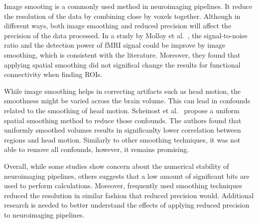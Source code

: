 Image smooting is a commonly used method in neuroimaging pipelines.
It reduce the resolution of the data by combining close by voxels together.
Although in different ways, both image smoothing and reduced precision will affect
the precision of the data processed.
In a study by Molloy et al.~\cite{Molloy2014-oc}, the signal-to-noise ratio and the detection power
of fMRI signal could be improve by image smoothing, which is consistent with the literature.
Moreover, they found that applying spatial smoothing did not significal change the
results for functional connectivity when finding ROIs.

While image smoothing helps in correcting artifacts such as head motion, the smoothness
might be varied across the brain volume.
This can lead in confounds related to the smoothing of head motion.
Scheinost et al.~\cite{Scheinost2014-ds} propose a uniform spatial smoothing method
to reduce those confounds.
The authors found that uniformly smoothed volumes results in significanlty lower
correlation between regions and head motion.
Similarly to other smoothing techniques, it was not able to remove all confounds, however,
it remains promising.

Overall, while some studies show concern about the numerical stability of neuroimaging
pipelines, others suggests that a low amount of significant bits are used to perform calculations.
Moreover, frequently used smoothing techniques reduced the resolution  in similar fashion
that reduced precision would.
Additional research is needed to better understand the effects of applying reduced
precision to neuroimaging pipelines.
